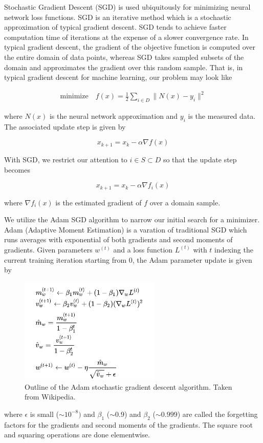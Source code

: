 Stochastic Gradient Descent (SGD) is used ubiquitously for minimizing neural network loss functions. SGD is an iterative 
method which is a stochastic approximation of typical gradient descent. SGD tends to achieve faster computation time of 
iterations at the expense of a slower convergence rate. In typical gradient descent, the gradient of the objective 
function is computed over the entire domain  of data points, whereas SGD takes sampled subsets of the domain and 
approximates the gradient over this random sample. That is, in typical gradient descent for machine learning, our 
problem may look like

\begin{align*}
    \text{minimize} \hspace{1em} f(x) = \frac{1}{2}\sum_{i \in D} \|N(x) - y_i \|^2
\end{align*}

where $N(x)$ is the neural network approximation and $y_i$ is the measured data. The associated update step is given by

$$
x_{k+1} = x_k - \alpha \nabla f(x)
$$

With SGD, we restrict our attention to $i \in S \subset D$ so that the update step becomes

$$
x_{k+1} = x_k - \alpha \nabla f_i(x)
$$

\noindent where $\nabla f_i(x)$ is the estimated gradient of $f$ over a domain sample.

We utilize the Adam SGD algorithm to narrow our initial search for a minimizer. Adam (Adaptive Moment Estimation) is a 
varation of traditional SGD which runs averages with exponential  of both gradients and second moments
of gradients. Given parameters $w^{(t)}$ and a loss function $L^{(t)}$ with $t$ indexing the current training iteration 
starting from 0, the Adam parameter update is given by

\begin{figure}[H]
    \includegraphics[width=0.6\textwidth]{images/adam.png}
    \centering
    \caption{Outline of the Adam stochastic gradient descent algorithm. Taken from Wikipedia.}
\end{figure}

where $\epsilon$ is small ($\sim10^{-8})$ and $\beta_1$ ($\sim0.9$) and $\beta_2$ ($\sim0.999$) are called the forgetting factors for the gradients and second moments of the gradients. The square root and squaring operations are done elementwise. 